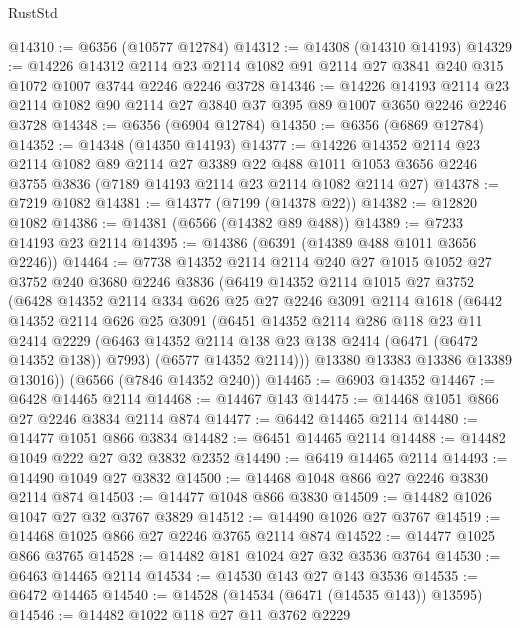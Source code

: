 \begin{lexlean}{RustStd}
\begin{coremodule}
{\begin{coremodule}
{{{{{{{{{{{{{{{{{{{{{{{{{{@14310 := @6356 (@10577 @12784)
@14312 := @14308 (@14310 @14193)
@14329 := @14226
    @14312
    @2114
    @23
    @2114
    @1082
    @91
    @2114
    @27
    @3841
    @240
    @315
    @1072
    @1007
    @3744
    @2246
    @2246
    @3728
@14346 := @14226
    @14193
    @2114
    @23
    @2114
    @1082
    @90
    @2114
    @27
    @3840
    @37
    @395
    @89
    @1007
    @3650
    @2246
    @2246
    @3728
@14348 := @6356 (@6904 @12784)
@14350 := @6356 (@6869 @12784)
@14352 := @14348 (@14350 @14193)
@14377 := @14226
    @14352
    @2114
    @23
    @2114
    @1082
    @89
    @2114
    @27
    @3389
    @22
    @488
    @1011
    @1053
    @3656
    @2246
    @3755
    @3836
    (@7189 @14193 @2114 @23 @2114 @1082 @2114 @27)
@14378 := @7219 @1082
@14381 := @14377 (@7199 (@14378 @22))
@14382 := @12820 @1082
@14386 := @14381 (@6566 (@14382 @89 @488))
@14389 := @7233 @14193 @23 @2114
@14395 := @14386 (@6391 (@14389 @488 @1011 @3656 @2246))
@14464 := @7738
    @14352
    @2114
    @2114
    @240
    @27
    @1015
    @1052
    @27
    @3752
    @240
    @3680
    @2246
    @3836
    (@6419
      @14352
      @2114
      @1015
      @27
      @3752
      (@6428
        @14352
        @2114
        @334
        @626
        @25
        @27
        @2246
        @3091
        @2114
        @1618
        (@6442
          @14352
          @2114
          @626
          @25
          @3091
          (@6451
            @14352
            @2114
            @286
            @118
            @23
            @11
            @2414
            @2229
            (@6463 @14352 @2114 @138 @23 @138 @2414 (@6471 (@6472 @14352 @138)) @7993)
            (@6577 @14352 @2114)))
        @13380
        @13383
        @13386
        @13389
        @13016))
    (@6566 (@7846 @14352 @240))
@14465 := @6903 @14352
@14467 := @6428 @14465 @2114
@14468 := @14467 @143
@14475 := @14468 @1051 @866 @27 @2246 @3834 @2114 @874
@14477 := @6442 @14465 @2114
@14480 := @14477 @1051 @866 @3834
@14482 := @6451 @14465 @2114
@14488 := @14482 @1049 @222 @27 @32 @3832 @2352
@14490 := @6419 @14465 @2114
@14493 := @14490 @1049 @27 @3832
@14500 := @14468 @1048 @866 @27 @2246 @3830 @2114 @874
@14503 := @14477 @1048 @866 @3830
@14509 := @14482 @1026 @1047 @27 @32 @3767 @3829
@14512 := @14490 @1026 @27 @3767
@14519 := @14468 @1025 @866 @27 @2246 @3765 @2114 @874
@14522 := @14477 @1025 @866 @3765
@14528 := @14482 @181 @1024 @27 @32 @3536 @3764
@14530 := @6463 @14465 @2114
@14534 := @14530 @143 @27 @143 @3536
@14535 := @6472 @14465
@14540 := @14528 (@14534 (@6471 (@14535 @143)) @13595)
@14546 := @14482 @1022 @118 @27 @11 @3762 @2229
}}}}}}}}}}}}}}}}}}}}}}}}}}
\end{coremodule}}
\end{coremodule}
\end{lexlean}
